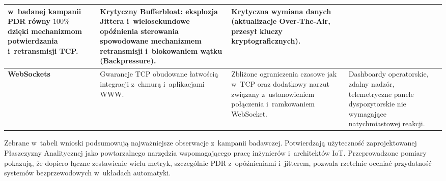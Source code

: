 \begin{table}[htbp]
{\begin{tabular}{|l|p{4.5cm}|p{4.5cm}|p{4.5cm}|}
                  w~badanej kampanii PDR równy $100\%$ dzięki mechanizmom potwierdzania i~retransmisji TCP.
                                    & \textbf{Krytyczny Bufferbloat:}
                  eksplozja Jittera i~wielosekundowe opóźnienia sterowania spowodowane mechanizmem retransmisji i~blokowaniem wątku (Backpressure).
                                    & Krytyczna wymiana danych (aktualizacje Over-The-Air, przesył kluczy kryptograficznych).                                                                                                                                                                     \\ \hline
                  \textbf{WebSockets}
                                    & Gwarancje TCP obudowane łatwością integracji z~chmurą i~aplikacjami WWW.
                                    & Zbliżone ograniczenia czasowe jak w~TCP oraz dodatkowy narzut związany z~ustanowieniem połączenia i~ramkowaniem WebSocket.
                                    & Dashboardy operatorskie, zdalny nadzór, telemetryczne panele dyspozytorskie nie wymagające natychmiastowej reakcji.                                                                                                                                         \\ \hline
            \end{tabular}%
      }
\end{table}

\vspace{0.5cm}

Zebrane w~tabeli wnioski podsumowują najważniejsze obserwacje z~kampanii badawczej.
Potwierdzają użyteczność zaprojektowanej Płaszczyzny Analitycznej jako powtarzalnego narzędzia wspomagającego pracę inżynierów i~architektów IoT.
Przeprowadzone pomiary pokazują, że dopiero łączne zestawienie wielu metryk, szczególnie PDR z~opóźnieniami i~jitterem, pozwala rzetelnie oceniać przydatność systemów bezprzewodowych w~układach automatyki.
